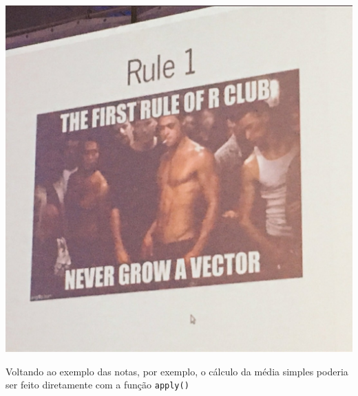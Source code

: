 \documentclass[10pt,a4paper]{book}
\begin{document}
\begin{center}\includegraphics[width=0.9\linewidth]{img/R_club} \end{center}

Voltando ao exemplo das notas, por exemplo, o cálculo da média simples
poderia ser feito diretamente com a função \texttt{apply()}
\end{document}
